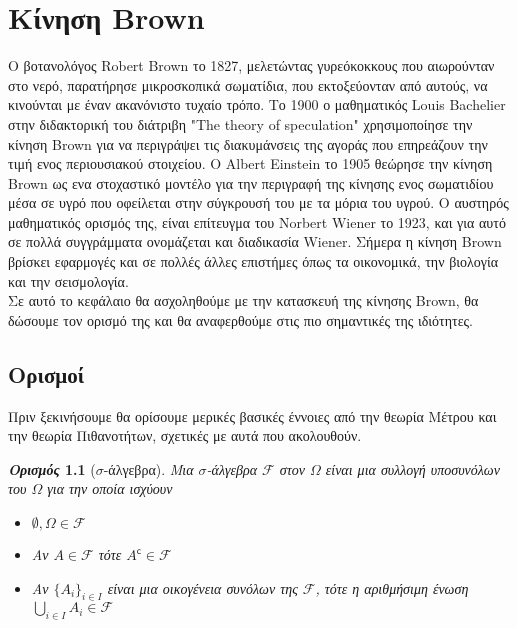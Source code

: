 \documentclass[12pt,a4paper,twoside,openany]{book}
\newtheorem{definition}{\textit{Ορισμός}}[section]
\begin{document}
\chapter{Κίνηση Brown}	
		Ο βοτανολόγος Robert Brown το 1827, μελετώντας γυρεόκοκκους που αιωρούνταν στο νερό, παρατήρησε μικροσκοπικά σωματίδια, που εκτοξεύονταν από αυτούς, να κινούνται με έναν ακανόνιστο τυχαίο τρόπο. Το 1900 ο μαθηματικός Louis Bachelier στην διδακτορική του διάτριβη "The theory of speculation" χρησιμοποίησε την κίνηση Brown για να περιγράψει τις διακυμάνσεις της αγοράς που επηρεάζουν την τιμή ενος περιουσιακού στοιχείου. Ο Albert Einstein το 1905 θεώρησε την κίνηση Brown ως ενα στοχαστικό μοντέλο για την περιγραφή της κίνησης ενος σωματιδίου μέσα σε υγρό που οφείλεται στην σύγκρουσή του με τα μόρια του υγρού. Ο αυστηρός μαθηματικός ορισμός της, είναι επίτευγμα του Norbert Wiener το 1923, και για αυτό σε πολλά συγγράμματα ονομάζεται και διαδικασία Wiener. Σήμερα η κίνηση Brown  βρίσκει εφαρμογές και σε πολλές άλλες επιστήμες όπως τα οικονομικά, την βιολογία και την σεισμολογία.
	\vspace{2.5mm}\\
		Σε αυτό το κεφάλαιο θα ασχοληθούμε με την κατασκευή της κίνησης Brown,  θα δώσουμε τον ορισμό της και θα αναφερθούμε στις πιο σημαντικές της ιδιότητες.
	\section{Ορισμοί}
	\vspace{2.5mm}
		Πριν ξεκινήσουμε θα ορίσουμε μερικές βασικές έννοιες από την θεωρία Μέτρου και την θεωρία Πιθανοτήτων, σχετικές με αυτά που ακολουθούν.
		
		\begin{definition}[$\sigma$-άλγεβρα]
			Μια $\sigma$-άλγεβρα $\mathcal{F}$ στον $\Omega$ είναι μια συλλογή υποσυνόλων του $\Omega$ για την οποία ισχύουν
			\begin{itemize}
				\item $\emptyset,\Omega\in\mathcal{F}$
				\item Αν $A\in\mathcal{F}$ τότε $A^\mathsf{c}\in\mathcal{F}$
				\item Αν $\{A_i\}_{i\in I}$ είναι μια οικογένεια συνόλων της $\mathcal{F}$, τότε η αριθμήσιμη ένωση\\ $\bigcup\limits_{i\in I}^{} A_i \in\mathcal{F}$
			\end{itemize}
		\end{definition}
		
\end{document}
